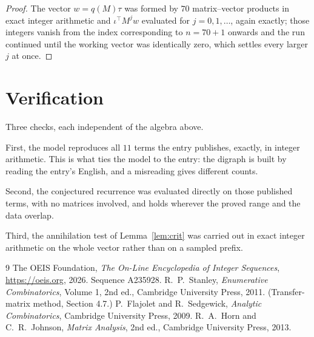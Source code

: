 \documentclass[11pt,a4paper]{article}
\theoremstyle{plain}
\theoremstyle{definition}
\begin{document}
\begin{proof}
The vector $w=q(M)\tau$ was formed by $70$ matrix--vector products in exact integer
arithmetic and $\iota^{\!\top}M^{j}w$ evaluated for $j=0,1,\dots$, again exactly; those
integers vanish from the index corresponding to $n=70+1$ onwards and the run continued
until the working vector was identically zero, which settles every larger $j$ at once.
\end{proof}

\section{Verification}

Three checks, each independent of the algebra above.

First, the model reproduces all $11$ terms the entry publishes, exactly, in integer
arithmetic. This is what ties the model to the entry: the digraph is built by reading the
entry's English, and a misreading gives different counts.

Second, the conjectured recurrence was evaluated directly on those published terms, with no
matrices involved, and holds wherever the proved range and the data overlap.

Third, the annihilation test of Lemma~\ref{lem:crit} was carried out in exact integer
arithmetic on the whole vector rather than on a sampled prefix.

\begin{thebibliography}{9}
 The OEIS Foundation, \emph{The On-Line Encyclopedia of Integer
Sequences}, \url{https://oeis.org}, 2026. Sequence A235928.
 R.~P.~Stanley, \emph{Enumerative Combinatorics}, Volume 1, 2nd ed.,
Cambridge University Press, 2011. (Transfer-matrix method, Section 4.7.)
 P.~Flajolet and R.~Sedgewick, \emph{Analytic Combinatorics}, Cambridge
University Press, 2009.
 R.~A.~Horn and C.~R.~Johnson, \emph{Matrix Analysis}, 2nd ed., Cambridge
University Press, 2013.
\end{thebibliography}
\end{document}
